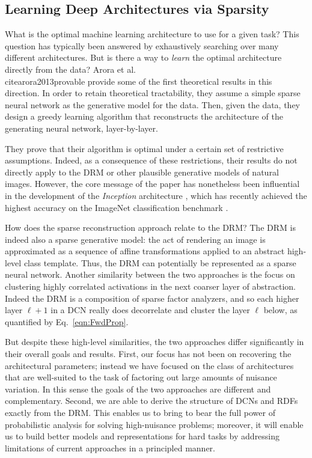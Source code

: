 \documentclass[12pt]{article}
\begin{document}
\subsection{Learning Deep Architectures via Sparsity}

What is the optimal machine learning architecture to use for a given task? This question has typically been answered by exhaustively searching over many different architectures. But is there a way to \emph{learn} the optimal architecture directly from the data?
Arora et al.\\cite{arora2013provable} provide some of the first theoretical results in this direction. In order to retain theoretical tractability, they assume a simple sparse neural network as the generative model for the data. Then, given the data, they design a greedy learning algorithm that reconstructs the architecture of the generating neural network, layer-by-layer. 

They prove that their algorithm is optimal under a certain set of restrictive assumptions. Indeed, as a consequence of these restrictions, their results do not directly apply to the DRM or other plausible generative models of natural images. However, the core message of the paper has nonetheless been influential in the development of the \emph{Inception} architecture \cite{szegedy2014going}, which has recently achieved the highest accuracy on the ImageNet classification benchmark \cite{ioffe2015batch}.

How does the sparse reconstruction approach relate to the DRM? The DRM is indeed also a sparse generative model: the act of rendering an image is approximated as a sequence of affine transformations applied to an abstract high-level class template. Thus, the DRM can potentially be represented as a sparse neural network. Another similarity between the two approaches is the focus on clustering  highly correlated activations in the next coarser layer of abstraction. Indeed the DRM is a composition of sparse factor analyzers, and so each higher layer $\ell+1$ in a DCN really does decorrelate and cluster the layer $\ell$ below, as quantified by Eq.~\ref{eqn:FwdProp}.

But despite these high-level similarities, the two approaches differ significantly in their overall goals and results. First, our focus has not been on recovering the architectural parameters; instead we have focused on the class of architectures that are well-suited to the task of factoring out large amounts of nuisance variation. In this sense the goals of the two approaches are different and complementary. Second, we are able to derive the structure of DCNs and RDFs exactly from the DRM. This enables us to bring to bear the full power of probabilistic analysis for solving high-nuisance problems; moreover, it will enable us to build better models and representations for hard tasks by addressing limitations of current approaches in a principled manner. 
\end{document}
